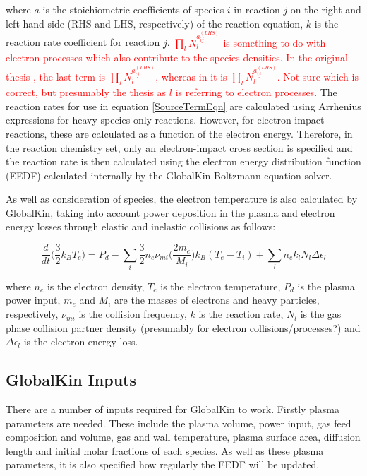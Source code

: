 \documentclass[11pt, oneside]{article}   	%
\begin{document}
where $a$ is the stoichiometric coefficients of species $i$ in reaction $j$ on the right and left hand side (RHS and LHS, respectively) of the reaction equation, $k$ is the reaction rate coefficient for reaction $j$.
\textcolor{red}{ $\prod_lN_l^{a_{ij}^{(LHS)}}$ is something to do with electron processes which also contribute to the species densities. 
In the original thesis \cite{Dorai2002modeling}, the last term is $\prod_lN_l^{a_{lj}^{(LHS)}}$, whereas in \cite{Stafford2004O2} it is $\prod_lN_l^{a_{ij}^{(LHS)}}$. 
Not sure which is correct, but presumably the thesis as $l$ is referring to electron processes.}
The reaction rates for use in equation \ref{SourceTermEqn} are calculated using Arrhenius expressions for heavy species only reactions. 
However, for electron-impact reactions, these are calculated as a function of the electron energy.
Therefore, in the reaction chemistry set, only an electron-impact cross section is specified and the reaction rate is then calculated using the electron energy distribution function (EEDF) calculated internally by the GlobalKin Boltzmann equation solver.

As well as consideration of species, the electron temperature is also calculated by GlobalKin, taking into account power deposition in the plasma and electron energy losses through elastic and inelastic collisions as follows:

\begin{equation}
\frac{d}{dt}\Big(\frac{3}{2}k_BT_e\Big) = P_d - \sum_i\frac{3}{2}n_e\nu_{mi}\Big(\frac{2m_e}{M_i}\Big)k_B(T_e - T_i) + \sum_l n_ek_lN_l\Delta\epsilon_l
\label{ElectronTempEqn}
\end{equation}

where $n_e$ is the electron density, $T_e$ is the electron temperature, $P_d$ is the plasma power input, $m_e$ and $M_i$ are the masses of electrons and heavy particles, respectively, $\nu_{mi}$ is the collision frequency, $k$ is the reaction rate, $N_l$ is the gas phase collision partner density (presumably for electron collisions/processes?) and $\Delta\epsilon_l$ is the electron energy loss.

\subsection{GlobalKin Inputs}
There are a number of inputs required for GlobalKin to work.
Firstly plasma parameters are needed.
These include the plasma volume, power input, gas feed composition and volume, gas and wall temperature, plasma surface area, diffusion length and initial molar fractions of each species.
As well as these plasma parameters, it is also specified how regularly the EEDF will be updated.
\end{document}
